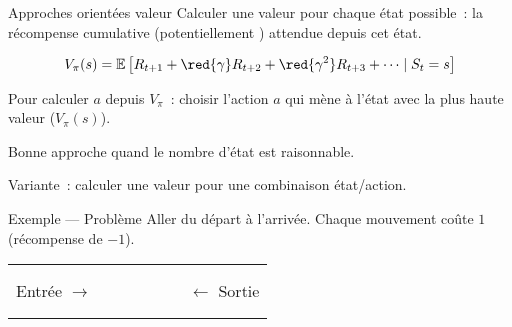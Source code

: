 \begin{frame}{Approches orientées valeur}
  Calculer une valeur pour chaque état possible~: la récompense cumulative (potentiellement ) attendue depuis cet état.

  \[
    V_\pi(s) = \mathbb{E}\left[
      R_{t + 1}
      + \red{\gamma} R_{t + 2}
      + \red{\gamma^2} R_{t + 3}
      + \dots
      \mid S_t = s
    \right]
  \]

  \pause

  Pour calculer $a$ depuis $V_\pi$~: choisir l'action $a$ qui mène à l'état avec la plus haute valeur ($V_\pi(s)$).

  \pause

  Bonne approche quand le nombre d'état est raisonnable.

  \pause

  Variante~: calculer une valeur pour une combinaison état/action.
\end{frame}

\begin{frame}{Exemple --- Problème}
  Aller du départ à l'arrivée. Chaque mouvement coûte $1$ (récompense de $-1$).

  \begin{tabular}{c|c|c|c|c|c|c}
    \cline{2-6}
     & & \cellcolor{black} & & & & \\
    \cline{2-6}
     & & \cellcolor{black} & & \cellcolor{black} & \cellcolor{black} & \\
    \cline{2-6}
    Entrée $\rightarrow$ & \phantom{-5} & \phantom{-5} & \phantom{-5} & \phantom{-5} & \phantom{-5} & $\leftarrow$ Sortie \\
    \cline{2-6}
     & & \cellcolor{black} & \cellcolor{black} & \cellcolor{black} & \cellcolor{black} & \\
    \cline{2-6}
     & & \cellcolor{black} & \cellcolor{black} & \cellcolor{black} & \cellcolor{black} & \\
    \cline{2-6}
  \end{tabular}
\end{frame}

